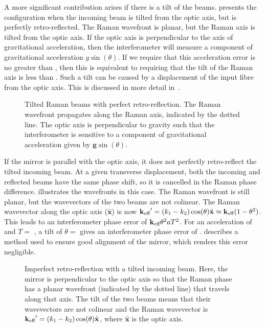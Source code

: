A more significant contribution 
arises if there is a tilt of the beams. 
presents the configuration when the incoming beam is tilted from the
optic axis, but is perfectly retro-reflected. The Raman wavefront is
planar, but the Raman axis is tilted from the optic axis. If the optic
axis is perpendicular to the axis of gravitational
acceleration, then the interferometer will measure a component of
gravitational acceleration $g \sin(\theta)$. If we require that this
acceleration error is no greater than , then
this is equivalent to requiring that the tilt of the Raman axis is
less than . Such a tilt can be caused by a
displacement of the input fibre from the optic axis. This is discussed
in more detail in~.
\begin{figure}[!htbp]
	\centering
  \fontsize{12pt}{12pt}
  \resizebox{0.5\textwidth}{!}{}
	\caption[Tilted Raman beams with perfect retro-reflection.]{Tilted
  Raman beams with perfect retro-reflection. The Raman wavefront
propagates along the Raman axis, indicated by the dotted line. The
optic axis is perpendicular to gravity such that the interferometer is
sensitive to a component of gravitational acceleration given by
$\textbf{g} \sin(\theta)$.}\label{fig:perfect_retro}
\end{figure}
\par\noindent
If the mirror is parallel with the optic axis, it does not perfectly
retro-reflect the tilted incoming beam. At a given transverse
displacement, both the incoming and reflected beams have the same
phase shift, so it is cancelled in the Raman phase difference. 
 illustrates the wavefronts in this
case. The Raman wavefront is still planar, but the wavevectors of the
two beams are not colinear. The Raman wavevector along the optic axis
($\hat{\textbf{x}}$)
is now ${\textbf k_\textnormal{eff}}' =
(k_1-k_2)\cos(\theta)\hat{\textbf{x}} \approx  {\textbf k_\textnormal{eff}} (1-\theta^2)$. This leads to an
interferometer phase error of ${\textbf k_\textnormal{eff}}\theta^2 a T^2$. For an
acceleration of  and $T = $ , a tilt
of $\theta = $  gives an interferometer
phase error of .  describes a method
used to ensure good alignment of the mirror, which
renders this error negligible.
\begin{figure}[htpb]
  \centering
  \fontsize{12pt}{12pt}
  \resizebox{0.5\textwidth}{!}{}
  \caption[Imperfect retro-reflection with a tilted incoming beam.
  ]{Imperfect retro-reflection with a tilted incoming beam.
  Here, the mirror is perpendicular to the optic axis so that the
Raman phase has a planar wavefront (indicated by the dotted line) that
travels along that axis. The tilt of the two beams means that their
wavevectors are not colinear and the Raman wavevector is ${\textbf k_\textnormal{eff}}' =
(k_1-k_2)\cos(\theta)\hat{\textbf{x}}$, where $\hat{\textbf{x}}$ is
the optic axis.}
  \label{fig:imperfect_retro}
\end{figure}
